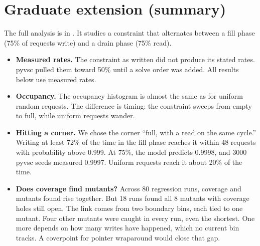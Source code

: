 \section{Graduate extension (summary)}
\label{sec:ext}

The full analysis is in . It studies
a constraint that alternates between a fill phase (75\% of requests write) and
a drain phase (75\% read).

\begin{itemize}
\item \textbf{Measured rates.} The constraint as written did not produce its
stated rates. pyvsc pulled them toward 50\% until a solve order was added. All
results below use measured rates.
\item \textbf{Occupancy.} The occupancy histogram is almost the same as for
uniform random requests. The difference is timing: the constraint sweeps from
empty to full, while uniform requests wander.
\item \textbf{Hitting a corner.} We chose the corner ``full, with a read on the
same cycle.'' Writing at least 72\% of the time in the fill phase reaches it
within 48 requests with probability above 0.999. At 75\%, the model predicts
0.9998, and 3000 pyvsc seeds measured 0.9997. Uniform requests reach it about
20\% of the time.
\item \textbf{Does coverage find mutants?} Across 80 regression runs, coverage
and mutants found rise together. But 18 runs found all 8 mutants with coverage
holes still open. The link comes from two boundary bins, each tied to one
mutant. Four other mutants were caught in every run, even the shortest. One
more depends on how many writes have happened, which no current bin tracks. A
coverpoint for pointer wraparound would close that gap.
\end{itemize}

